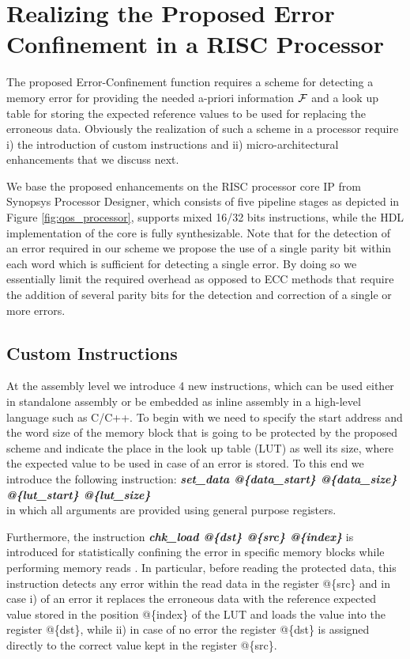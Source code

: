 \section{Realizing the Proposed Error Confinement in a RISC Processor} \label{sec:qos_asip}
The proposed Error-Confinement function requires a scheme for detecting a memory error 
for providing the needed a-priori information $\mathcal{F}$ and a look up table for storing the 
expected reference values to be used for replacing the erroneous data. Obviously the realization of such a scheme 
in a processor require i) the introduction of custom instructions and ii) micro-architectural enhancements that we discuss next.     

We base the proposed enhancements on the RISC processor core IP from Synopsys Processor Designer, 
which consists of five pipeline stages as depicted in Figure \ref{fig:qos_processor},  
supports mixed 16/32 bits instructions, while the HDL implementation of the core is fully synthesizable. 
Note that for the detection of an error required in our scheme we propose the use of a single parity bit within each word which is sufficient for detecting a single error. By doing so we essentially limit the required overhead as opposed to ECC methods  that require the addition of several parity bits for the detection and correction of a single or more errors.     

\subsection{Custom Instructions}
At the assembly level we introduce 4 new instructions, which can be used either in standalone assembly or be embedded as inline assembly in a high-level language such as C/C++.
 To begin with we need to specify  the start address and the word size of the memory block that is going to be protected by the proposed scheme and indicate the place in the look up table (LUT) as well its size, where the expected value to be used in case of an error is stored. To this end we introduce the following instruction:     
  \textit{\textbf{set\_data @\{data\_start\} @\{data\_size\} @\{lut\_start\} @\{lut\_size\}}} \\
in which all arguments are provided using general purpose registers.

Furthermore, the instruction \textit{\textbf{chk\_load @\{dst\} @\{src\} @\{index\}}} is introduced for 
statistically confining the error in specific memory blocks while performing memory reads . In particular, before reading the protected data, this instruction detects any error within the read data in the register @\{src\} and in case i) of an error it replaces the erroneous data with the reference expected value stored in the position @\{index\} of the LUT and loads the value
into the register @\{dst\}, while ii) in case of no error the register @\{dst\} is assigned directly to the correct value kept in the register @\{src\}.


